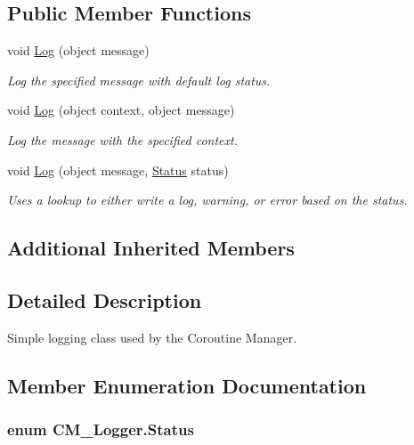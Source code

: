 \subsection*{Public Member Functions}
\begin{DoxyCompactItemize}
\item 
void \hyperlink{class_c_m___logger_a0fc384c005b14bcb9364fee0b82cfd96}{Log} (object message)
\begin{DoxyCompactList}\small\item\em Log the specified message with default log status. \end{DoxyCompactList}\item 
void \hyperlink{class_c_m___logger_a9000aa99a894afb7002eff79cf788483}{Log} (object context, object message)
\begin{DoxyCompactList}\small\item\em Log the message with the specified context. \end{DoxyCompactList}\item 
void \hyperlink{class_c_m___logger_ad08aaafdb501fce63a5fac80e2077e44}{Log} (object message, \hyperlink{class_c_m___logger_ac2e71ba1ec4f24a09693eeae7b77611c}{Status} status)
\begin{DoxyCompactList}\small\item\em Uses a lookup to either write a log, warning, or error based on the status. \end{DoxyCompactList}\end{DoxyCompactItemize}
\subsection*{Additional Inherited Members}


\subsection{Detailed Description}
Simple logging class used by the Coroutine Manager. 



\subsection{Member Enumeration Documentation}
\hypertarget{class_c_m___logger_ac2e71ba1ec4f24a09693eeae7b77611c}{}
\subsubsection[{Status}]{\setlength{\rightskip}{0pt plus 5cm}enum {\bf C\+M\+\_\+\+Logger.\+Status}\hspace{0.3cm}{\ttfamily [strong]}}\label{class_c_m___logger_ac2e71ba1ec4f24a09693eeae7b77611c}


